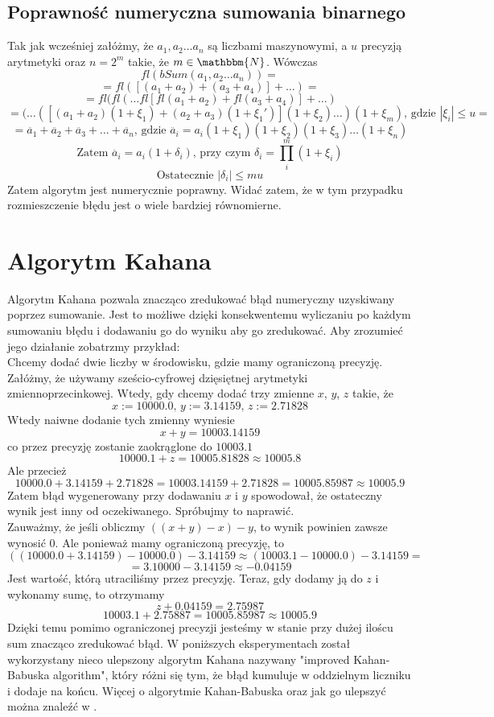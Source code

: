 \documentclass[11pt, wide]{article}
\begin{document}
    \subsection{Poprawność numeryczna sumowania binarnego}
    Tak jak wcześniej załóżmy, że $a_1,a_2 \ldots a_n$ są liczbami maszynowymi, a $u$ precyzją arytmetyki oraz $n = 2^m $ takie, że $ m \in \mathbbm{N}$. Wówczas
$$
    fl(bSum(a_1,a_2 \ldots a_n)) = 
$$
$$
    = fl([(a_1 + a_2)+(a_3 + a_4)] + \ldots) = 
$$
$$
    = fl(fl(\ldots fl[fl(a_1 + a_2) + fl(a_3 + a_4)] + \ldots)
$$
$$
    = (\ldots([(a_1 + a_2)(1 + \xi_1) + (a_2 + a_3)(1 + \xi_1')](1 + \xi_2) \ldots )(1 + \xi_m) \text{, gdzie } |\xi_i| \leq u = 
$$
$$
    = \ddot{a_1} + \ddot{a_2} + \ddot{a_3} + \ldots + \ddot{a_n} \text{, gdzie } \ddot{a_i} = a_i(1 + \xi_1)(1 + \xi_2)(1 + \xi_3) \ldots (1 + \xi_n)
$$  
$$
    \text{Zatem } \ddot{a_i} = a_i(1 + \delta_i) \text{, przy czym } \delta_i = \prod_i^{m}(1 + \xi_i)
$$
$$
    \text{Ostatecznie } |\delta_i| \leq mu
$$
    Zatem algorytm jest numerycznie poprawny. 
    Widać zatem, że w tym przypadku rozmieszczenie błędu jest o wiele bardziej równomierne.
    \section{Algorytm Kahana}
    Algorytm Kahana pozwala znacząco zredukować błąd numeryczny uzyskiwany poprzez
    sumowanie. Jest to możliwe dzięki konsekwentemu wyliczaniu po każdym sumowaniu
    błędu i dodawaniu go do wyniku aby go zredukować. Aby zrozumieć jego działanie zobatrzmy przykład:
    \\
    Chcemy dodać dwie liczby w środowisku, gdzie mamy ograniczoną precyzję. Załóżmy, że 
    używamy sześcio-cyfrowej dzięsiętnej arytmetyki zmiennoprzecinkowej. Wtedy, gdy chcemy dodać trzy zmienne
    $x$, $y$, $z$  takie, że 
    $$x := 10000.0 \text{, }y:= 3.14159 \text{, } z:=2.71828$$
    Wtedy naiwne dodanie tych zmienny wyniesie
     $$x + y = 10003.14159$$  co przez precyzję zostanie 
    zaokrąglone do $10003.1$
    $$10000.1 + z = 10005.81828\approx 10005.8$$
    Ale przecież
    $$10000.0 + 3.14159 + 2.71828 = 10003.14159 + 2.71828 = 10005.85987\approx 10005.9$$
    Zatem błąd wygenerowany przy dodawaniu $x$ i $y$ spowodował, że ostateczny wynik jest inny od oczekiwanego. Spróbujmy to naprawić.
    \\
    Zauważmy, że jeśli obliczmy $((x + y) - x) - y$, to wynik powinien zawsze wynosić $0$. Ale ponieważ mamy ograniczoną
    precyzję, to 
    $$
    ((10000.0 + 3.14159) - 10000.0) - 3.14159 \approx (10003.1 - 10000.0) - 3.14159 =
    $$
    $$
    = 3.10000 - 3.14159 \approx -0.04159
    $$
    Jest wartość, którą utraciliśmy przez precyzję. Teraz, gdy dodamy ją do $z$ i wykonamy sumę, to otrzymamy
    $$
    z + 0.04159 = 2.75987 
    $$
    $$
    10003.1 + 2.75887 = 10005.85987 \approx 10005.9
    $$
    Dzięki temu pomimo ograniczonej precyzji jesteśmy w stanie przy dużej iloścu sum znacząco zredukować błąd.
    W poniższych eksperymentach został wykorzystany nieco ulepszony algorytm Kahana nazywany "improved Kahan-Babuska algorithm", który różni się tym, że błąd kumuluje w oddzielnym liczniku i dodaje na końcu.
    Więcej o algorytmie Kahan-Babuska oraz jak go ulepszyć można znaleźć w \cite{KH}.
\end{document}
